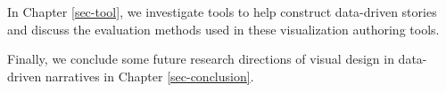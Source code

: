 In Chapter \ref{sec-tool}, we investigate tools to help construct data-driven stories and discuss the evaluation methods used in these visualization authoring tools. 


Finally, we 
conclude some future research directions of visual  design in data-driven narratives in Chapter \ref{sec-conclusion}. 


\newpage

